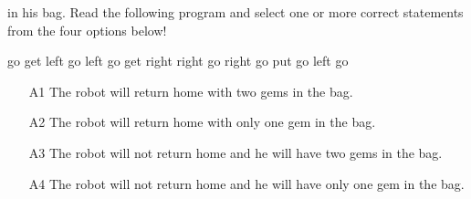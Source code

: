 \begin{enumerate}
in his bag. Read the following program and select one or more correct statements from the four options below!
\begin{bluecode}
go
get
left
go
left
go
get
right
right
go
right
go
put
go
left 
go
\end{bluecode}
\begin{enumerate}
\item[A1] The robot will return home with two gems in the bag.
\item[A2] The robot will return home with only one gem in the bag.
\item[A3] The robot will not return home and he will have two gems in the bag.
\item[A4] The robot will not return home and he will have only one gem in the bag.
\end{enumerate}


\end{enumerate}
